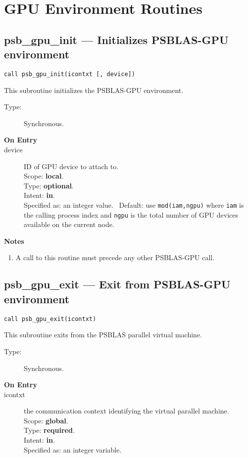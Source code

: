 
\section{GPU Environment Routines}
\label{sec:gpuenv}

\subsection*{psb\_gpu\_init --- Initializes PSBLAS-GPU
  environment}

\begin{verbatim}
call psb_gpu_init(icontxt [, device])
\end{verbatim}

This subroutine initializes the PSBLAS-GPU  environment. 
\begin{description}
\item[Type:] Synchronous.
\item[\bf  On Entry ]
\item[device] ID of GPU device to attach to.\\
Scope: {\bf local}.\\
Type: {\bf optional}.\\
Intent: {\bf in}.\\
Specified as: an integer value. \
Default: use \verb|mod(iam,ngpu)| where \verb|iam| is the calling
process index and \verb|ngpu| is the total number of GPU devices
available on the current node. 
\end{description}


{\par\noindent\large\bfseries Notes}
\begin{enumerate}
\item A call to this routine must precede any other PSBLAS-GPU call. 
\end{enumerate}

\subsection*{psb\_gpu\_exit --- Exit from  PSBLAS-GPU
  environment}

\begin{verbatim}
call psb_gpu_exit(icontxt)
\end{verbatim}

This subroutine exits from the  PSBLAS parallel virtual  machine.
\begin{description}
\item[Type:] Synchronous.
\item[\bf  On Entry ]
\item[icontxt] the communication context identifying the virtual
  parallel machine.\\
Scope: {\bf global}.\\
Type: {\bf required}.\\
Intent: {\bf in}.\\
Specified as: an integer variable.
\end{description}





